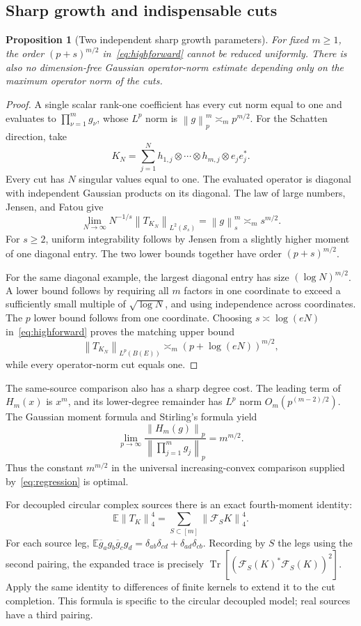 \documentclass[11pt,a4paper]{amsart}
\numberwithin{equation}{section}
\newtheorem{proposition}[theorem]{Proposition}
\theoremstyle{definition}
\theoremstyle{remark}
\newcommand{\E}{\mathbb E}
\newcommand{\Sch}{\mathcal S}
\newcommand{\Flat}{\mathcal F}
\DeclareMathOperator{\Tr}{Tr}
\newcommand{\norm}[1]{\left\lVert#1\right\rVert}
\begin{document}
\subsection{Sharp growth and indispensable cuts}
\begin{proposition}[Two independent sharp growth parameters]\label{prop:sharpfinite}
For fixed $m\ge1$, the order $(p+s)^{m/2}$ in~\eqref{eq:highforward} cannot be reduced uniformly. There is also no dimension-free Gaussian operator-norm estimate depending only on the maximum operator norm of the cuts.
\end{proposition}
\begin{proof}
A single scalar rank-one coefficient has every cut norm equal to one and evaluates to $\prod_{\nu=1}^mg_\nu$, whose $L^p$ norm is $\norm g_p^m\asymp_m p^{m/2}$. For the Schatten direction, take
\[
 K_N=\sum_{j=1}^Nh_{1,j}\otimes\cdots\otimes h_{m,j}\otimes e_je_j^*.
\]
Every cut has $N$ singular values equal to one. The evaluated operator is diagonal with independent Gaussian products on its diagonal. The law of large numbers, Jensen, and Fatou give
\[
 \lim_{N\to\infty}N^{-1/s}\norm{T_{K_N}}_{L^2(\Sch_s)}
 =\norm g_s^m\asymp_m s^{m/2}.
\]
For $s\ge2$, uniform integrability follows by Jensen from a slightly higher moment of one diagonal entry. The two lower bounds together have order $(p+s)^{m/2}$.

For the same diagonal example, the largest diagonal entry has size $(\log N)^{m/2}$. A lower bound follows by requiring all $m$ factors in one coordinate to exceed a sufficiently small multiple of $\sqrt{\log N}$, and using independence across coordinates. The $p$ lower bound follows from one coordinate. Choosing $s\asymp\log(eN)$ in~\eqref{eq:highforward} proves the matching upper bound
\[
 \norm{T_{K_N}}_{L^p(B(E))}\asymp_m(p+\log(eN))^{m/2},
\]
while every operator-norm cut equals one.
\end{proof}

The same-source comparison also has a sharp degree cost. The leading term of $H_m(x)$ is $x^m$, and its lower-degree remainder has $L^p$ norm $O_m(p^{(m-2)/2})$. The Gaussian moment formula and Stirling's formula yield
\[
 \lim_{p\to\infty}\frac{\norm{H_m(g)}_p}
 {\norm{\prod_{j=1}^mg_j}_p}=m^{m/2}.
\]
Thus the constant $m^{m/2}$ in the universal increasing-convex comparison supplied by~\eqref{eq:regression} is optimal.

For decoupled circular complex sources there is an exact fourth-moment identity:
\begin{equation}\label{eq:fourthmoment}
 \E\norm{T_K}_4^4=\sum_{S\subset[m]}\norm{\Flat_SK}_4^4.
\end{equation}
For each source leg,
$\E\overline g_ag_b\overline g_cg_d
 =\delta_{ab}\delta_{cd}+\delta_{ad}\delta_{cb}$.
Recording by $S$ the legs using the second pairing, the expanded trace is precisely
$\Tr[(\Flat_S(K)^*\Flat_S(K))^2]$.
Apply the same identity to differences of finite kernels to extend it to the cut completion. This formula is specific to the circular decoupled model; real sources have a third pairing.
\end{document}
